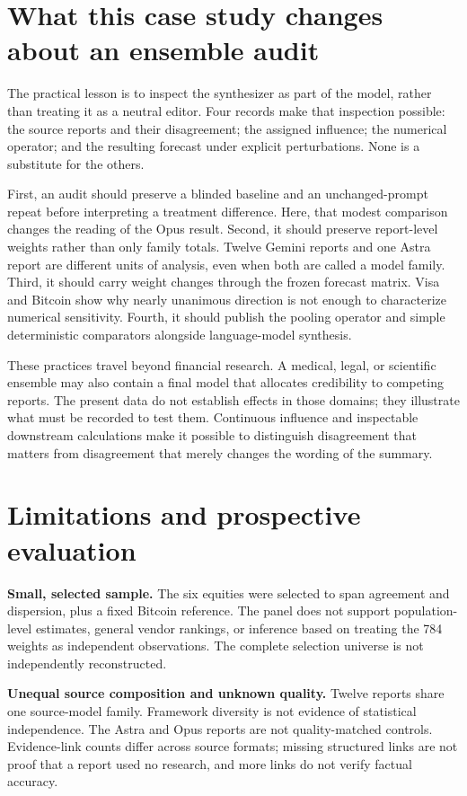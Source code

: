 \documentclass[11pt]{article}
\begin{document}
\section{What this case study changes about an ensemble audit}
The practical lesson is to inspect the synthesizer as part of the model, rather than treating it as a neutral editor. Four records make that inspection possible: the source reports and their disagreement; the assigned influence; the numerical operator; and the resulting forecast under explicit perturbations. None is a substitute for the others.

First, an audit should preserve a blinded baseline and an unchanged-prompt repeat before interpreting a treatment difference. Here, that modest comparison changes the reading of the Opus result. Second, it should preserve report-level weights rather than only family totals. Twelve Gemini reports and one Astra report are different units of analysis, even when both are called a model family. Third, it should carry weight changes through the frozen forecast matrix. Visa and Bitcoin show why nearly unanimous direction is not enough to characterize numerical sensitivity. Fourth, it should publish the pooling operator and simple deterministic comparators alongside language-model synthesis.

These practices travel beyond financial research. A medical, legal, or scientific ensemble may also contain a final model that allocates credibility to competing reports. The present data do not establish effects in those domains; they illustrate what must be recorded to test them. Continuous influence and inspectable downstream calculations make it possible to distinguish disagreement that matters from disagreement that merely changes the wording of the summary.

\section{Limitations and prospective evaluation}
\textbf{Small, selected sample.} The six equities were selected to span agreement and dispersion, plus a fixed Bitcoin reference. The panel does not support population-level estimates, general vendor rankings, or inference based on treating the 784 weights as independent observations. The complete selection universe is not independently reconstructed.

\textbf{Unequal source composition and unknown quality.} Twelve reports share one source-model family. Framework diversity is not evidence of statistical independence. The Astra and Opus reports are not quality-matched controls. Evidence-link counts differ across source formats; missing structured links are not proof that a report used no research, and more links do not verify factual accuracy.
\end{document}
